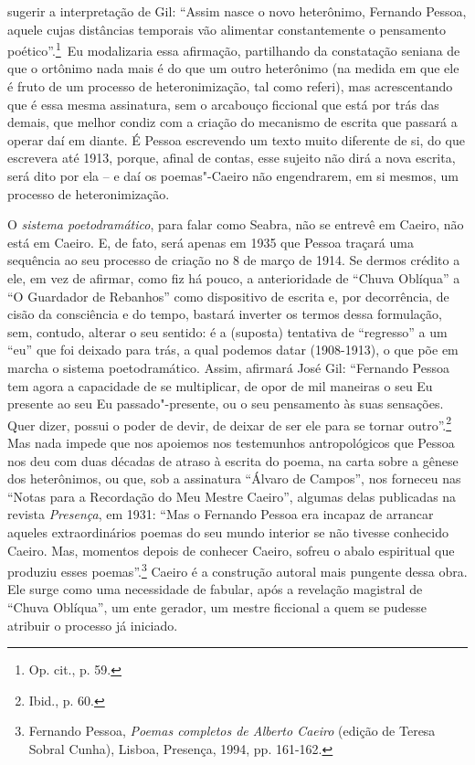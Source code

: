 sugerir a interpretação de Gil: ``Assim nasce o novo heterônimo,
Fernando Pessoa, aquele cujas distâncias temporais vão alimentar
constantemente o pensamento poético''.\footnote{Op. cit., p. 59.}~Eu
modalizaria essa afirmação, partilhando da constatação seniana de que o
ortônimo nada mais é do que um outro heterônimo (na medida em que ele é
fruto de um processo de heteronimização, tal como referi), mas
acrescentando que é essa mesma assinatura, sem o arcabouço ficcional que
está por trás das demais, que melhor condiz com a criação do mecanismo
de escrita que passará a operar daí em diante. É Pessoa escrevendo um
texto muito diferente de si, do que escrevera até 1913, porque, afinal
de contas, esse sujeito não dirá a nova escrita, será dito por ela -- e
daí os poemas"-Caeiro não engendrarem, em si mesmos, um processo de
heteronimização.

O \emph{sistema poetodramático}, para falar como Seabra, não se entrevê
em Caeiro, não está em Caeiro. E, de fato, será apenas em 1935 que
Pessoa traçará uma sequência ao seu processo de criação no 8 de março de
1914. Se dermos crédito a ele, em vez de afirmar, como fiz há pouco, a
anterioridade de ``Chuva Oblíqua'' a ``O Guardador de Rebanhos'' como
dispositivo de escrita e, por decorrência, de cisão da consciência e do
tempo, bastará inverter os termos dessa formulação, sem, contudo,
alterar o seu sentido: é a (suposta) tentativa de ``regresso'' a um
``eu'' que foi deixado para trás, a qual podemos datar (1908-1913), o
que põe em marcha o sistema poetodramático. Assim, afirmará José Gil:
``Fernando Pessoa tem agora a capacidade de se multiplicar, de opor de
mil maneiras o seu Eu presente ao seu Eu passado"-presente, ou o seu
pensamento às suas sensações. Quer dizer, possui o poder de devir, de
deixar de ser ele para se tornar outro''.\footnote{Ibid., p. 60.} Mas
nada impede que nos apoiemos nos testemunhos antropológicos que
Pessoa nos deu com duas décadas de atraso à escrita do poema, na carta
sobre a gênese dos heterônimos, ou que, sob a assinatura ``Álvaro de
Campos'', nos forneceu nas ``Notas para a Recordação do Meu Mestre
Caeiro'', algumas delas publicadas na revista \emph{Presença}, em 1931: ``Mas o
Fernando Pessoa era incapaz de arrancar aqueles extraordinários poemas
do seu mundo interior se não tivesse conhecido Caeiro. Mas, momentos
depois de conhecer Caeiro, sofreu o abalo espiritual que produziu esses
poemas''.\footnote{Fernando Pessoa, \emph{Poemas completos de Alberto
  Caeiro} (edição de Teresa Sobral Cunha), Lisboa, Presença, 1994, pp.
  161-162.} Caeiro é a construção autoral mais pungente dessa obra. Ele
surge como uma necessidade de fabular, após a revelação magistral de
``Chuva Oblíqua'', um ente gerador, um mestre ficcional a quem se pudesse atribuir
o processo já iniciado.

